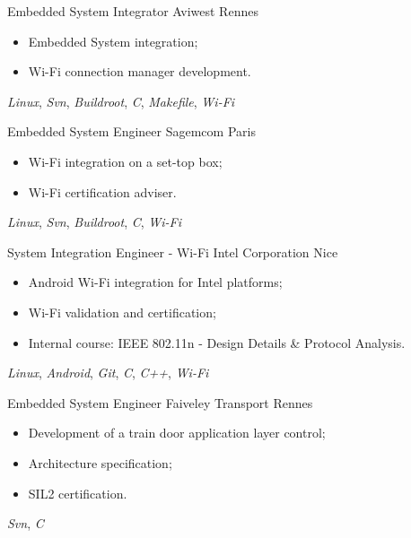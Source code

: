 \documentclass[11pt,a4paper,sans]{moderncv}
\begin{document}
	{Embedded System Integrator}
	{Aviwest}
	{Rennes}
	{}
	{
		\begin{itemize}
		\item Embedded System integration;
		\item Wi-Fi connection manager development.
		\end{itemize}
		\textit{Linux},
		\textit{Svn},
		\textit{Buildroot},
		\textit{C}, \textit{Makefile},
		\textit{Wi-Fi}
	}
	{Embedded System Engineer}
	{Sagemcom}
	{Paris}
	{}
	{
		\begin{itemize}
		\item Wi-Fi integration on a set-top box;
		\item Wi-Fi certification adviser.
		\end{itemize}
		\textit{Linux},
		\textit{Svn},
		\textit{Buildroot},
		\textit{C},
		\textit{Wi-Fi}
	}
	{System Integration Engineer - Wi-Fi}
	{Intel Corporation}
	{Nice}
	{}
	{
		\begin{itemize}
		\item Android Wi-Fi integration for Intel platforms;
		\item Wi-Fi validation and certification;
		\item Internal course: IEEE 802.11n
			- Design Details \& Protocol Analysis.
		\end{itemize}
		\textit{Linux}, \textit{Android},
		\textit{Git},
		\textit{C}, \textit{C++},
		\textit{Wi-Fi}
	}
	{Embedded System Engineer}
	{Faiveley Transport}
	{Rennes}
	{}
	{
		\begin{itemize}
		\item Development of a train door application layer control;
		\item Architecture specification;
		\item SIL2 certification.
		\end{itemize}
		\textit{Svn},
		\textit{C}
	}
\end{document}
